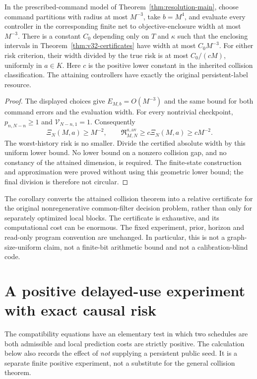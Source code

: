 \begin{corollary}
\label{cor:v32-relative}
In the prescribed-command model of Theorem~\ref{thm:resolution-main},
choose command partitions with radius at most $M^{-3}$, take
$b=M^4$, and evaluate every controller in the corresponding finite net
to objective-enclosure width at most $M^{-3}$. There is a constant $C_0$
depending only on $T$ and $\kappa$ such that the enclosing intervals
in Theorem~\ref{thm:v32-certificates} have width at most $C_0M^{-3}$.
For either risk criterion, their width divided by the true risk is at
most $C_0/(cM)$, uniformly in $a\in K$. Here $c$ is the positive lower
constant in the inherited collision classification. The attaining
controllers have exactly the original persistent-label resource.
\end{corollary}
\begin{proof}
The displayed choices give $E_{M,b}=O(M^{-3})$ and the same bound for
both command errors and the evaluation width. For every nontrivial
checkpoint, $p_{n,N-n}\ge1$ and $\mathcal V_{N-n,1}=1$. Consequently
\[
 \Xi_N(M,a)\ge M^{-2},\qquad
 \mathfrak R_{M,N}^{a,\mathrm{av}}
       \ge c\Xi_N(M,a)\ge cM^{-2}.
\]
The worst-history risk is no smaller. Divide the certified absolute
width by this uniform lower bound. No lower bound on a nonzero collision
gap, and no constancy of the attained dimension, is required. The
finite-state construction and approximation were proved without using
this geometric lower bound; the final division is therefore not circular.
\end{proof}

The corollary converts the attained collision theorem into a relative
certificate for the original nonregenerative common-filter decision
problem, rather than only for separately optimized local blocks. The
certificate is exhaustive, and its computational cost can be enormous.
The fixed experiment, prior, horizon and read-only program convention
are unchanged. In particular, this is not a graph-size-uniform claim,
not a finite-bit arithmetic bound and not a calibration-blind code.

\section{A positive delayed-use experiment with exact causal risk}
\label{sec:v32-delayed}

The compatibility equations have an elementary test in which two schedules
are both admissible and local prediction costs are strictly positive.
The calculation below also records the effect of \emph{not} supplying a
persistent public seed. It is a separate finite positive experiment,
not a substitute for the general collision theorem.

